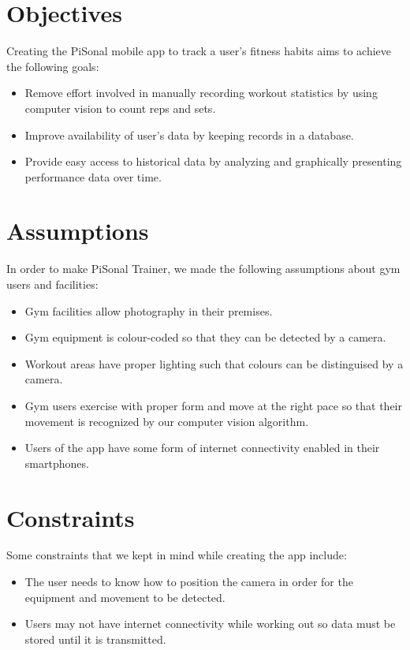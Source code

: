 \documentclass{article}
\begin{document}
\section{Objectives}
Creating the PiSonal mobile app to track a user's fitness habits aims to achieve the following goals:
\begin{itemize}
    \item Remove effort involved in manually recording workout statistics by using computer vision to count reps and sets.
    \item Improve availability of user's data by keeping records in a database.
    \item Provide easy access to historical data by analyzing and graphically presenting performance data over time.
\end{itemize}

\newpage
\section{Assumptions}
In order to make PiSonal Trainer, we made the following assumptions about gym users and facilities:
\begin{itemize}
    \item Gym facilities allow photography in their premises.
    \item Gym equipment is colour-coded so that they can be detected by a camera.
    \item Workout areas have proper lighting such that colours can be distinguised by a camera.
    \item Gym users exercise with proper form and move at the right pace so that their movement is recognized by our computer vision algorithm.
    \item Users of the app have some form of internet connectivity enabled in their smartphones.
\end{itemize}

\section{Constraints}
Some constraints that we kept in mind while creating the app include:
\begin{itemize}
    \item The user needs to know how to position the camera in order for the equipment and movement to be detected.
    \item Users may not have internet connectivity while working out so data must be stored until it is transmitted.
\end{itemize}
\end{document}
